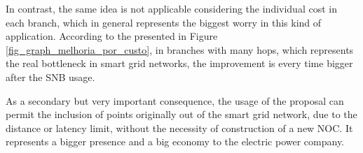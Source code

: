 \documentclass[conference]{IEEEtran}
\begin{document}
In contrast, the same idea is not applicable considering the individual cost in each branch, which in general represents the biggest worry in this kind of application. According to the presented in Figure \ref{fig_graph_melhoria_por_custo}, in branches with many hops, which represents the real bottleneck in smart grid networks, the improvement is every time bigger after the SNB usage.

As a secondary but very important consequence, the usage of the proposal can permit the inclusion of points originally out of the smart grid network, due to the distance or latency limit, without the necessity of construction of a new NOC. It represents a bigger presence and a big economy to the electric power company. 




\end{document}
